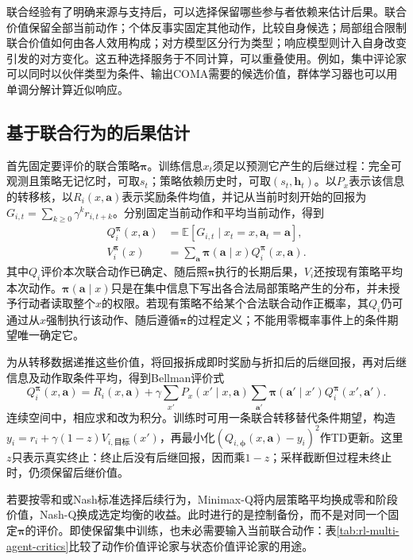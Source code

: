 联合经验有了明确来源与支持后，可以选择保留哪些参与者依赖来估计后果。联合价值保留全部当前动作；个体反事实固定其他动作，比较自身候选；局部组合限制联合价值如何由各人效用构成；对方模型区分行为类型；响应模型则计入自身改变引发的对方变化。这五种选择服务于不同计算，可以重叠使用。例如，集中评论家可以同时以伙伴类型为条件、输出COMA需要的候选价值，群体学习器也可以用单调分解计算近似响应。

\subsection{基于联合行为的后果估计}
\label{sec:rl-multi-agent-joint-value}

首先固定要评价的联合策略$\bm\pi$。训练信息$x_t$须足以预测它产生的后继过程：完全可观测且策略无记忆时，可取$s_t$；策略依赖历史时，可取$(s_t,\bm h_t)$。以$P_x$表示该信息的转移核，以$R_i(x,\bm a)$表示奖励条件均值，并记从当前时刻开始的回报为$G_{i,t}=\sum_{k\geq0}\gamma^k r_{i,t+k}$。分别固定当前动作和平均当前动作，得到
\begin{align}
 Q_i^{\bm\pi}(x,\bm a)
 &=\mathbb E[G_{i,t}\mid x_t=x,\bm a_t=\bm a],\\
 V_i^{\bm\pi}(x)
 &=\sum_{\bm a}\bm\pi(\bm a\mid x)Q_i^{\bm\pi}(x,\bm a).
\end{align}
其中$Q_i$评价本次联合动作已确定、随后照$\bm\pi$执行的长期后果，$V_i$还按现有策略平均本次动作。$\bm\pi(\bm a\mid x)$只是在集中信息下写出各合法局部策略产生的分布，并未授予行动者读取整个$x$的权限。若现有策略不给某个合法联合动作正概率，其$Q_i$仍可通过从$x$强制执行该动作、随后遵循$\bm\pi$的过程定义；不能用零概率事件上的条件期望唯一确定它。

为从转移数据递推这些价值，将回报拆成即时奖励与折扣后的后继回报，再对后继信息及动作取条件平均，得到Bellman评价式
\begin{equation}
 Q_i^{\bm\pi}(x,\bm a)=R_i(x,\bm a)+
 \gamma\sum_{x'}P_x(x'\mid x,\bm a)
       \sum_{\bm a'}\bm\pi(\bm a'\mid x')Q_i^{\bm\pi}(x',\bm a').
 \label{eq:rl-multi-agent-joint-bellman}
\end{equation}
连续空间中，相应求和改为积分。训练时可用一条联合转移替代条件期望，构造
$y_i=r_i+\gamma(1-z)V_{i,\text{目标}}(x')$，再最小化$(Q_{i,\bm\phi}(x,\bm a)-y_i)^2$作TD更新。这里$z$只表示真实终止：终止后没有后继回报，因而乘$1-z$；采样截断但过程未终止时，仍须保留后继价值。

若要按零和或Nash标准选择后续行为，Minimax-Q将内层策略平均换成零和阶段价值，Nash-Q换成选定均衡的收益。此时进行的是控制备份，而不是对同一个固定$\bm\pi$的评价。即使保留集中训练，也未必需要输入当前联合动作：表\ref{tab:rl-multi-agent-critics}比较了动作价值评论家与状态价值评论家的用途。

